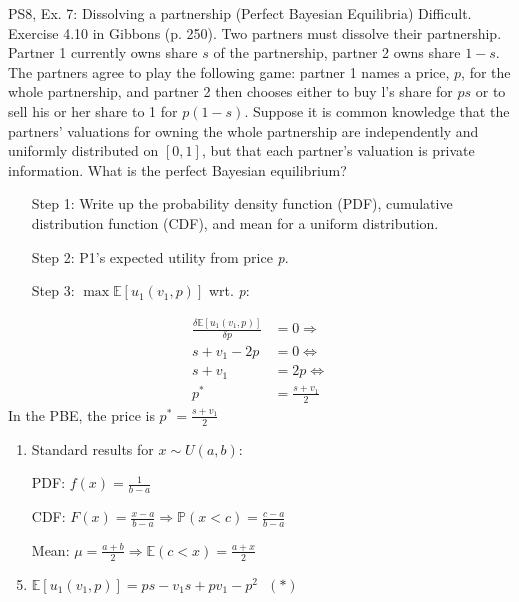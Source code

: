 \begin{frame}{PS8, Ex. 7: Dissolving a partnership (Perfect Bayesian Equilibria)}
    Difficult. Exercise 4.10 in Gibbons (p. 250). Two partners must dissolve their partnership. Partner 1 currently owns share $s$ of the partnership, partner 2 owns share $1-s$. The partners agree to play the following game: partner 1 names a price, $p$, for the whole partnership, and partner 2 then chooses either to buy l's share for $ps$ or to sell his or her share to 1 for $p(1-s)$. Suppose it is common knowledge that the partners' valuations for owning the whole partnership are independently and uniformly distributed on $[0,1]$, but that each partner's valuation is private information. What is the perfect Bayesian equilibrium?\vspace{-11pt}
    \begin{multicols}{2}
      \begin{itemize}
        \item[Step 1:] Write up the probability density function (PDF), cumulative distribution function (CDF), and mean for a uniform distribution.
        \item[Step 2:] P1's expected utility from price \textit{p}.
        \item[Step 3:] $\max\mathbb{E}[u_1(v_1,p)]$ wrt. \textit{p}:
      \end{itemize}\vspace{-6pt}
      \begin{align*}
        \frac{\delta \mathbb{E}[u_1(v_1,p)]}{\delta p}&=0\Rightarrow\\
        s+v_1-2p&=0\Leftrightarrow\\
        s+v_1&=2p\Leftrightarrow\\
        p^*&=\frac{s+v_1}{2}
      \end{align*}
      In the PBE, the price is $p^*=\frac{s+v_1}{2}$
      \vfill\null\columnbreak
      \begin{enumerate}
        \item Standard results for $x\sim U(a, b):$
        \item[PDF:]  $f(x)=\frac{1}{b-a}$
        \item[CDF:]  $F(x)=\frac{x-a}{b-a}\Rightarrow\mathbb{P}(x<c)=\frac{c-a}{b-a}$
        \item[Mean:] $\mu=\frac{a+b}{2}\Rightarrow\mathbb{E}(c<x)=\frac{a+x}{2}$
        \item $\mathbb{E}[u_1(v_1,p)]=ps-v_1s+pv_1-p^2\ \ \ (*)$
      \end{enumerate}
      \vfill\null
    \end{multicols}
\end{frame}

